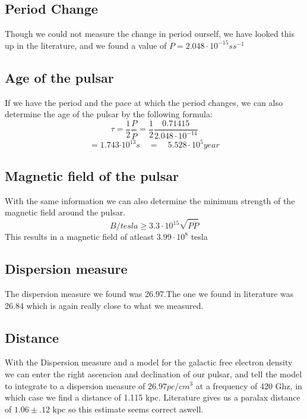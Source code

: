 \documentclass[twoside,twocolumn]{article}
\begin{document}
	\subsection{Period Change}
	Though we could not measure the change in period ourself, we have looked this up in the literature, and we found a value of $\dot{P} = 2.048 \cdot {10}^{-15} s  {s}^{-1}$	\cite{Hobbs}
	
	\subsection{Age of the pulsar}
	If we have the period and the pace at which the period changes, we can also determine the age of the pulsar by the following formula: \cite{Ryan}
		\begin{equation}
	\tau =\frac { 1 }{ 2 } \frac { P }{ \dot { P }  } =\frac { 1 }{ 2 } \frac { 0.71415 }{ 2.048\cdot { 10 }^{ -14 } } 
		\end{equation}
		\begin{equation}
		=1.743{ \cdot 10 }^{ 13 }s\quad =\quad 5.528\cdot { 10 }^{ 5 } year
		\end{equation}
	
	\subsection{Magnetic field of the pulsar}
	With the same information we can also determine the minimum strength of the magnetic field around the pulsar.
	\begin{equation}
	B/tesla\ge 3.3\cdot { 10 }^{ 15 }\sqrt { P\dot { P }  } 
	\end{equation}
	This results in a magnetic field of atleast $3.99\cdot{10}^{8}$ tesla
	
	\subsection{Dispersion measure}
	The dispersion measure we found was 26.97.The one we found in literature was 26.84 \cite{Wang} which is again really close to what we measured. 
	
	\subsection{Distance}
	With the Dispersion measure and a model for the galactic free electron density we can enter the right ascencion and declination of our pulsar, and tell the model to integrate to a dispersion measure of $26.97 pc/{cm}^{3}$ at a frequency of 420 Ghz, in which case we find a distance of 1.115 kpc. Literature\cite{Wang} gives us a paralax distance of $1.06\pm.12$ kpc so this estimate seems correct aswell.
		
\end{document}

